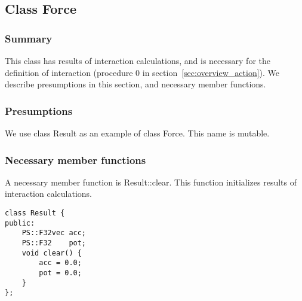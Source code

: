 \subsection{Class Force}
\label{sec:example_force}

\subsubsection{Summary}

This class has results of interaction calculations, and is necessary
for the definition of interaction (procedure 0 in
section~\ref{sec:overview_action}). We describe presumptions in this
section, and necessary member functions.

\subsubsection{Presumptions}

We use class Result as an example of class Force. This name is
mutable.

\subsubsection{Necessary member functions}

A necessary member function is Result::clear. This function
initializes results of interaction calculations.


\begin{screen}
\begin{verbatim}
class Result {
public:
    PS::F32vec acc;
    PS::F32    pot;
    void clear() {
        acc = 0.0;
        pot = 0.0;
    }
};
\end{verbatim}
\end{screen}

